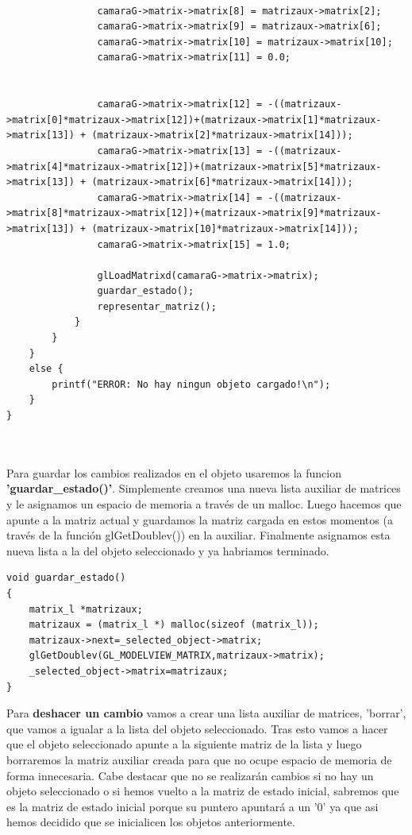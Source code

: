 \documentclass[12pt,a4paper]{article}
\begin{document}
\begin{enumerate}
\begin{lstlisting}
	
				camaraG->matrix->matrix[8] = matrizaux->matrix[2];	
				camaraG->matrix->matrix[9] = matrizaux->matrix[6];
				camaraG->matrix->matrix[10] = matrizaux->matrix[10];
				camaraG->matrix->matrix[11] = 0.0;
	
	
				camaraG->matrix->matrix[12] = -((matrizaux->matrix[0]*matrizaux->matrix[12])+(matrizaux->matrix[1]*matrizaux->matrix[13]) + (matrizaux->matrix[2]*matrizaux->matrix[14]));
				camaraG->matrix->matrix[13] = -((matrizaux->matrix[4]*matrizaux->matrix[12])+(matrizaux->matrix[5]*matrizaux->matrix[13]) + (matrizaux->matrix[6]*matrizaux->matrix[14]));				
				camaraG->matrix->matrix[14] = -((matrizaux->matrix[8]*matrizaux->matrix[12])+(matrizaux->matrix[9]*matrizaux->matrix[13]) + (matrizaux->matrix[10]*matrizaux->matrix[14]));
				camaraG->matrix->matrix[15] = 1.0;

				glLoadMatrixd(camaraG->matrix->matrix);	
        		guardar_estado();
        		representar_matriz();
            }  
        }
    }
    else {
        printf("ERROR: No hay ningun objeto cargado!\n");
    }
}



\end{lstlisting}


Para guardar los cambios realizados en el objeto usaremos la funcion \textbf{'guardar\_estado()'}. Simplemente creamos una nueva lista auxiliar de matrices y le asignamos un espacio de memoria a través de un malloc. Luego hacemos que apunte a la matriz actual y guardamos la matriz cargada en estos momentos (a través de la función glGetDoublev()) en la auxiliar. Finalmente asignamos esta nueva lista a la del objeto seleccionado y ya habriamos terminado.\newline

\begin{lstlisting}
void guardar_estado()
{
    matrix_l *matrizaux;
    matrizaux = (matrix_l *) malloc(sizeof (matrix_l));
    matrizaux->next=_selected_object->matrix;
    glGetDoublev(GL_MODELVIEW_MATRIX,matrizaux->matrix);
    _selected_object->matrix=matrizaux;   
}
\end{lstlisting}


Para \textbf{deshacer un cambio} vamos a crear una lista auxiliar de matrices, 'borrar', que vamos a igualar a la lista del objeto seleccionado. Tras esto vamos a hacer que el objeto seleccionado apunte a la siguiente matriz de la lista y luego borraremos la matriz auxiliar creada para que no ocupe espacio de memoria de forma innecesaria.\newline
Cabe destacar que no se realizarán cambios si no hay un objeto seleccionado o si hemos vuelto a la matriz de estado inicial, sabremos que es la matriz de estado inicial porque su puntero apuntará a un '0' ya que asi hemos decidido que se inicialicen los objetos anteriormente.\newline


\end{enumerate}
\end{document}
